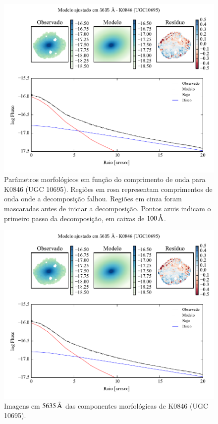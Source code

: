 \begin{figure}
	\includegraphics[page=2]{figuras-decomp/K0846_sample006a}
	\caption[Parâmetros morfológicos em função do comprimento de onda de K0846
	(UGC 10695)]
	{Parâmetros morfológicos em função do comprimento de onda para
	K0846 (UGC 10695). Regiões em rosa representam comprimentos de onda onde a
	decomposição falhou. Regiões em cinza foram mascaradas antes de iniciar a
	decomposição. Pontos azuis indicam o primeiro passo da decomposição, em caixas
	de $100\,\text{\normalfont\AA}$.}
	\label{fig:decompParams:K0846}
\end{figure}

\begin{figure}
	\includegraphics[page=3]{figuras-decomp/K0846_sample006a}
	\caption[Imagens em $5635\,\angstrom$ das componentes morfológicas de K0846
	(UGC 10695)]
	{Imagens em $5635\,\angstrom$ das componentes morfológicas de K0846
	(UGC 10695).}
	\label{fig:decompImages:K0846}
\end{figure}

